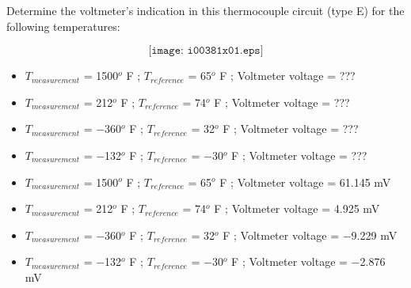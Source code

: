 

Determine the voltmeter's indication in this thermocouple circuit (type E) for the following temperatures:

$$\texttt{[image: i00381x01.eps]}$$

\begin{itemize}
\item{} $T_{measurement}$ = 1500$^{o}$ F ; $T_{reference}$ = 65$^{o}$ F ; Voltmeter voltage = ??? 
\item{} $T_{measurement}$ = 212$^{o}$ F ; $T_{reference}$ = 74$^{o}$ F ; Voltmeter voltage = ??? 
\item{} $T_{measurement}$ = $-$360$^{o}$ F ; $T_{reference}$ = 32$^{o}$ F ; Voltmeter voltage = ??? 
\item{} $T_{measurement}$ = $-$132$^{o}$ F ; $T_{reference}$ = $-$30$^{o}$ F ; Voltmeter voltage = ??? 
\end{itemize}







\begin{itemize}
\item{} $T_{measurement}$ = 1500$^{o}$ F ; $T_{reference}$ = 65$^{o}$ F ; Voltmeter voltage = 61.145 mV 
\item{} $T_{measurement}$ = 212$^{o}$ F ; $T_{reference}$ = 74$^{o}$ F ; Voltmeter voltage = 4.925 mV 
\item{} $T_{measurement}$ = $-$360$^{o}$ F ; $T_{reference}$ = 32$^{o}$ F ; Voltmeter voltage = $-$9.229 mV 
\item{} $T_{measurement}$ = $-$132$^{o}$ F ; $T_{reference}$ = $-$30$^{o}$ F ; Voltmeter voltage = $-$2.876 mV 
\end{itemize}











